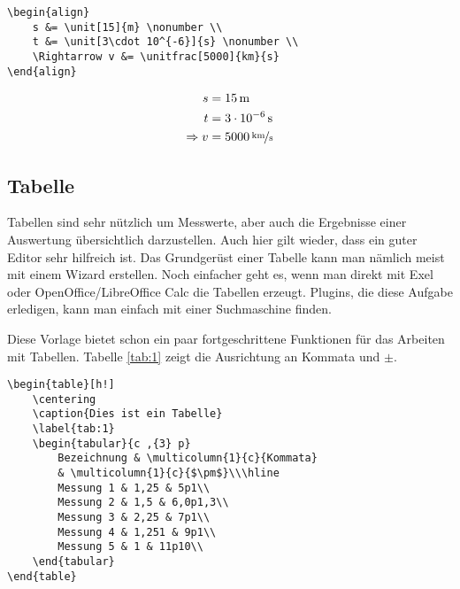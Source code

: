 \begin{verbatim}
\begin{align}
    s &= \unit[15]{m} \nonumber \\
    t &= \unit[3\cdot 10^{-6}]{s} \nonumber \\
    \Rightarrow v &= \unitfrac[5000]{km}{s}
\end{align}
\end{verbatim}

\begin{align}
    s &= \unit[15]{m} \nonumber \\
    t &= \unit[3\cdot 10^{-6}]{s} \nonumber \\
    \Rightarrow v &= \unitfrac[5000]{km}{s}
\end{align}

\subsection{Tabelle}

Tabellen sind sehr nützlich um Messwerte, aber auch die Ergebnisse einer Auswertung übersichtlich darzustellen. Auch hier gilt wieder, dass ein guter Editor sehr hilfreich ist. Das Grundgerüst einer Tabelle kann man nämlich meist mit einem Wizard erstellen. Noch einfacher geht es, wenn man direkt mit Exel oder OpenOffice/LibreOffice Calc die Tabellen erzeugt. Plugins, die diese Aufgabe erledigen, kann man einfach mit einer Suchmaschine finden.

Diese Vorlage bietet schon ein paar fortgeschrittene Funktionen für das Arbeiten mit Tabellen. Tabelle \ref{tab:1} zeigt die Ausrichtung an Kommata und $\pm$.

\begin{verbatim}
\begin{table}[h!]
    \centering
    \caption{Dies ist ein Tabelle}
    \label{tab:1}
    \begin{tabular}{c ,{3} p}
        Bezeichnung & \multicolumn{1}{c}{Kommata}
        & \multicolumn{1}{c}{$\pm$}\\\hline
        Messung 1 & 1,25 & 5p1\\
        Messung 2 & 1,5 & 6,0p1,3\\
        Messung 3 & 2,25 & 7p1\\
        Messung 4 & 1,251 & 9p1\\
        Messung 5 & 1 & 11p10\\
    \end{tabular}
\end{table}
\end{verbatim}

